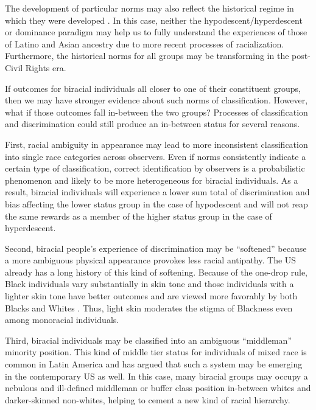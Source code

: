 \documentclass[
  12pt,
  letterpaper,
]{article}
\begin{document}
The development of particular norms may also reflect the historical
regime in which they were developed
\autocite{gullickson_choosing_2011,iverson_regimes_2022}. In this case,
neither the hypodescent/hyperdescent or dominance paradigm may help us
to fully understand the experiences of those of Latino and Asian
ancestry due to more recent processes of racialization. Furthermore, the
historical norms for all groups may be transforming in the post-Civil
Rights era.

If outcomes for biracial individuals all closer to one of their
constituent groups, then we may have stronger evidence about such norms
of classification. However, what if those outcomes fall in-between the
two groups? Processes of classification and discrimination could still
produce an in-between status for several reasons.

First, racial ambiguity in appearance may lead to more inconsistent
classification into single race categories across observers. Even if
norms consistently indicate a certain type of classification, correct
identification by observers is a probabilistic phenomenon and likely to
be more heterogeneous for biracial individuals. As a result, biracial
individuals will experience a lower sum total of discrimination and bias
affecting the lower status group in the case of hypodescent and will not
reap the same rewards as a member of the higher status group in the case
of hyperdescent.

Second, biracial people's experience of discrimination may be
``softened'' because a more ambiguous physical appearance provokes less
racial antipathy. The US already has a long history of this kind of
softening. Because of the one-drop rule, Black individuals vary
substantially in skin tone and those individuals with a lighter skin
tone have better outcomes
\autocite{keith_skin_1991,hughes_significance_1990,monk_skin_2014} and
are viewed more favorably by both Blacks and Whites
\autocite{maddox_cognitive_2002a}. Thus, light skin moderates the stigma
of Blackness even among monoracial individuals.

Third, biracial individuals may be classified into an ambiguous
``middleman'' minority position. This kind of middle tier status for
individuals of mixed race is common in Latin America
\autocite{telles_race_2009} and \textcite{bonilla-silva_biracial_2004}
has argued that such a system may be emerging in the contemporary US as
well. In this case, many biracial groups may occupy a nebulous and
ill-defined middleman or buffer class position in-between whites and
darker-skinned non-whites, helping to cement a new kind of racial
hierarchy.
\end{document}

